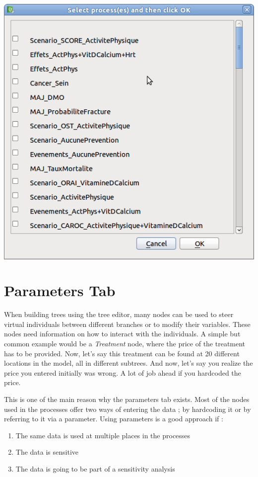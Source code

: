 \documentclass[a4paper,11pt]{report}
\begin{document}
\begin{center}
\includegraphics[scale=0.3]{Pictures/Processes/ProcImport.png}
\label{fig:impProc}
\end{center}

\section{Parameters Tab}
\label{sec:paramTab}
When building trees using the tree editor, many nodes can be used to steer virtual individuals between different branches or to modify their variables. These nodes need information on how to interact with the individuals. A simple but common example would be a \emph{Treatment} node, where the price of the treatment has to be provided. Now, let's say this treatment can be found at 20 different locations in the model, all in different subtrees. And now, let's say you realize the price you entered initially was wrong. A lot of job ahead if you hardcoded the price.

This is one of the main reason why the parameters tab exists. Most of the nodes used in the processes offer two ways of entering the data ; by hardcoding it or by referring to it via a parameter. Using parameters is a good approach if :
\begin{enumerate}
\item{The same data is used at multiple places in the processes}
\item{The data is sensitive} 
\item{The data is going to be part of a sensitivity analysis} 
\end{enumerate}
\end{document}
